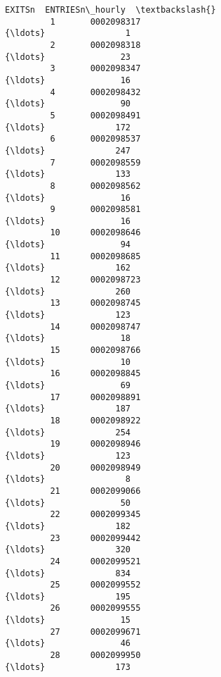 \documentclass[11pt]{article}
\begin{document}
\begin{Verbatim}[commandchars=\\\{\}]
                                                            EXITSn  ENTRIESn\_hourly  \textbackslash{}
         1       0002098317                                    {\ldots}                1   
         2       0002098318                                    {\ldots}               23   
         3       0002098347                                    {\ldots}               16   
         4       0002098432                                    {\ldots}               90   
         5       0002098491                                    {\ldots}              172   
         6       0002098537                                    {\ldots}              247   
         7       0002098559                                    {\ldots}              133   
         8       0002098562                                    {\ldots}               16   
         9       0002098581                                    {\ldots}               16   
         10      0002098646                                    {\ldots}               94   
         11      0002098685                                    {\ldots}              162   
         12      0002098723                                    {\ldots}              260   
         13      0002098745                                    {\ldots}              123   
         14      0002098747                                    {\ldots}               18   
         15      0002098766                                    {\ldots}               10   
         16      0002098845                                    {\ldots}               69   
         17      0002098891                                    {\ldots}              187   
         18      0002098922                                    {\ldots}              254   
         19      0002098946                                    {\ldots}              123   
         20      0002098949                                    {\ldots}                8   
         21      0002099066                                    {\ldots}               50   
         22      0002099345                                    {\ldots}              182   
         23      0002099442                                    {\ldots}              320   
         24      0002099521                                    {\ldots}              834   
         25      0002099552                                    {\ldots}              195   
         26      0002099555                                    {\ldots}               15   
         27      0002099671                                    {\ldots}               46   
         28      0002099950                                    {\ldots}              173   

\end{Verbatim}
\end{document}
